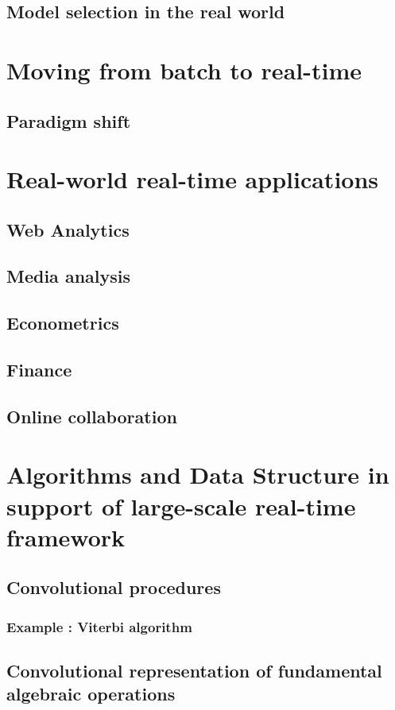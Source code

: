 \documentclass[]{book}    %
\begin{document}
\section{Model selection in the real world}

\chapter{Moving from batch to real-time}
\section{Paradigm shift}

\chapter{Real-world real-time applications}
\section{Web Analytics}
\section{Media analysis}
\section{Econometrics}
\section{Finance}
\section{Online collaboration}

\chapter{Algorithms and Data Structure in support of large-scale real-time framework}
\section{Convolutional procedures}
\subsection{Example : Viterbi algorithm}

\section{Convolutional representation of fundamental algebraic operations}
\end{document}
